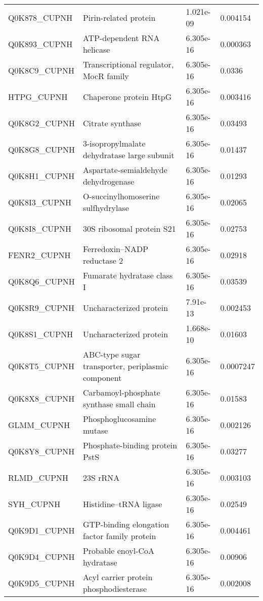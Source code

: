 \begin{center}
\begin{longtable}{ l l l l }
Q0K878\_CUPNH & Pirin-related protein& 1.021e-09 & 0.004154 \\ [0.5ex]
Q0K893\_CUPNH & ATP-dependent RNA helicase& 6.305e-16 & 0.000363 \\ [0.5ex]
Q0K8C9\_CUPNH & Transcriptional regulator, MocR family& 6.305e-16 & 0.0336 \\ [0.5ex]
HTPG\_CUPNH & Chaperone protein HtpG& 6.305e-16 & 0.003416 \\ [0.5ex]
Q0K8G2\_CUPNH & Citrate synthase& 6.305e-16 & 0.03493 \\ [0.5ex]
Q0K8G8\_CUPNH & 3-isopropylmalate dehydratase large subunit& 6.305e-16 & 0.01437 \\ [0.5ex]
Q0K8H1\_CUPNH & Aspartate-semialdehyde dehydrogenase& 6.305e-16 & 0.01293 \\ [0.5ex]
Q0K8I3\_CUPNH & O-succinylhomoserine sulfhydrylase& 6.305e-16 & 0.02065 \\ [0.5ex]
Q0K8I8\_CUPNH & 30S ribosomal protein S21& 6.305e-16 & 0.02753 \\ [0.5ex]
FENR2\_CUPNH & Ferredoxin--NADP reductase 2& 6.305e-16 & 0.02918 \\ [0.5ex]
Q0K8Q6\_CUPNH & Fumarate hydratase class I& 6.305e-16 & 0.03539 \\ [0.5ex]
Q0K8R9\_CUPNH & Uncharacterized protein& 7.91e-13 & 0.002453 \\ [0.5ex]
Q0K8S1\_CUPNH & Uncharacterized protein& 1.668e-10 & 0.01603 \\ [0.5ex]
Q0K8T5\_CUPNH & ABC-type sugar transporter, periplasmic component& 6.305e-16 & 0.0007247 \\ [0.5ex]
Q0K8X8\_CUPNH & Carbamoyl-phosphate synthase small chain& 6.305e-16 & 0.01583 \\ [0.5ex]
GLMM\_CUPNH & Phosphoglucosamine mutase& 6.305e-16 & 0.002126 \\ [0.5ex]
Q0K8Y8\_CUPNH & Phosphate-binding protein PstS& 6.305e-16 & 0.03277 \\ [0.5ex]
RLMD\_CUPNH & 23S rRNA& 6.305e-16 & 0.003103 \\ [0.5ex]
SYH\_CUPNH & Histidine--tRNA ligase& 6.305e-16 & 0.02549 \\ [0.5ex]
Q0K9D1\_CUPNH & GTP-binding elongation factor family protein& 6.305e-16 & 0.004461 \\ [0.5ex]
Q0K9D4\_CUPNH & Probable enoyl-CoA hydratase& 6.305e-16 & 0.00906 \\ [0.5ex]
Q0K9D5\_CUPNH & Acyl carrier protein phosphodiesterase& 6.305e-16 & 0.002008 \\ [0.5ex]

\end{longtable}
\end{center}
